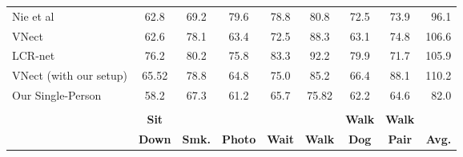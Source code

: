 \begin{table*}
{\begin{tabular}{@{}lcccccccr@{}}
\multicolumn{1}{l||}{Nie et al \cite{nie2017monocular}}     & 62.8          &  69.2  &  79.6       & 78.8  &  80.8       & 72.5        &  73.9        &  96.1       \\
\multicolumn{1}{l||}{VNect \cite{VNect_SIGGRAPH2017}\T}                              & 62.6            & 78.1  & 63.4        & 72.5  & 88.3       & 63.1        & 74.8                              & 106.6       \\
\multicolumn{1}{l||}{LCR-net \cite{rogez_lcr_cvpr17}}                              & 76.2            & 80.2  &  75.8        & 83.3  &  92.2       & 79.9        & 71.7                  & 105.9       \\ \hline\hline
\multicolumn{1}{l||}{VNect (with our setup) \T}                                                                & 65.52        & 78.8  & 64.8        & 75.0   & 85.2   & 66.4    & 88.1                          & 110.2   \\  
\multicolumn{1}{l||}{Our Single-Person\T}                                                                & {58.2}        & {67.3}   & {61.2}    & {65.7}   & {75.82}   & {62.2}    & {64.6}                          & {82.0}   \\  \\

\multicolumn{1}{l||}{\T}                      & \textbf{Sit} & \textbf{}   & \textbf{} & \textbf{}  & \textbf{}  & \textbf{Walk} & \multicolumn{1}{c||}{\textbf{Walk}} & \textbf{} \\ 
\multicolumn{1}{l||}{}                      & \textbf{Down} & \textbf{Smk.}   & \textbf{Photo} & \textbf{Wait}  & \textbf{Walk}  & \textbf{Dog} & \multicolumn{1}{c||}{\textbf{Pair}} & \textbf{Avg.} \\ \hline \hline


\end{tabular}}
\end{table*}
